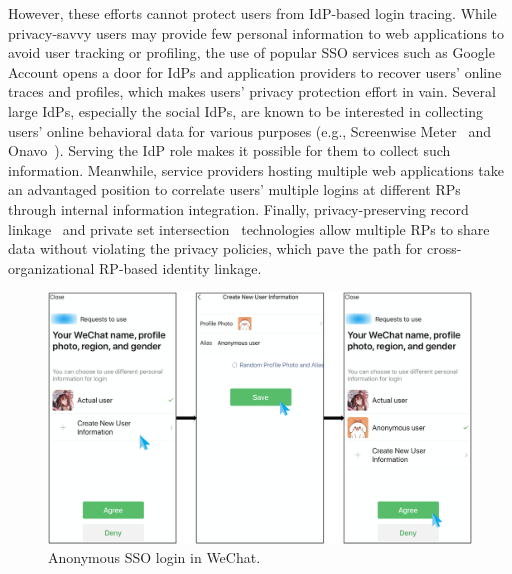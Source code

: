 However, these efforts cannot protect users from IdP-based login tracing. While privacy-savvy users may provide few personal information to web applications to avoid user tracking or profiling, the use of popular SSO services such as Google Account opens a door for IdPs and application providers to recover users' online traces and profiles, which makes users' privacy protection effort in vain. Several large IdPs, especially the social IdPs, are known to be interested in collecting users' online behavioral data for various purposes (e.g., Screenwise Meter~\cite{googlenews} and Onavo~\cite{Onavo}). Serving the IdP role makes it possible for them to collect such information. Meanwhile, service providers hosting multiple web applications take an advantaged position to correlate users' multiple logins at different RPs through internal information integration. Finally, privacy-preserving record linkage~\cite{agrawal2003information} and private set intersection~\cite{de2010practical} technologies allow multiple RPs to share data without violating the privacy policies, which pave the path for cross-organizational RP-based identity linkage.

\begin{figure}[t]
  \centering
  \includegraphics[width=0.9\linewidth]{fig/wechat.pdf}
  \caption{Anonymous SSO login in WeChat.}
  \label{fig:wechat}
  \vspace{-5mm}
\end{figure}


